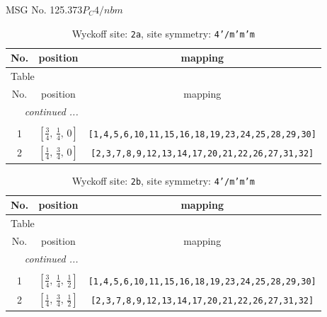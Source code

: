 \documentclass[fleqn,8pt]{jsarticle}
\begin{document}
\setcounter{MaxMatrixCols}{32}

\renewcommand{\tablename}{Table~}
\renewcommand{\figurename}{Figure~}
\begin{center}
\LARGE
MSG No. 125.373\quad$P_{C}4/nbm$
\end{center}
\renewcommand{\arraystretch}{1.2}
\begin{longtable}{ccc}
\caption{Wyckoff site: {\tt 2a}, site symmetry: {\tt 4'/m'm'm}}
 \\
 \hline \hline
No. & position & mapping \\ \hline \endfirsthead

\multicolumn{2}{l}{\tablename\ \thetable{}} \\
 \hline \hline
No. & position & mapping \\ \hline \endhead

 \hline \hline
\multicolumn{2}{r}{\footnotesize\it continued ...} \\ \endfoot

 \hline \hline
\multicolumn{2}{r}{} \\ \endlastfoot

1 & $\left[ \frac{3}{4},\, \frac{1}{4},\, 0 \right]$ & {\tt [1,4,5,6,10,11,15,16,18,19,23,24,25,28,29,30]} \\ \hline
2 & $\left[ \frac{1}{4},\, \frac{3}{4},\, 0 \right]$ & {\tt [2,3,7,8,9,12,13,14,17,20,21,22,26,27,31,32]} \\
\end{longtable}
\renewcommand{\arraystretch}{1.2}
\begin{longtable}{ccc}
\caption{Wyckoff site: {\tt 2b}, site symmetry: {\tt 4'/m'm'm}}
 \\
 \hline \hline
No. & position & mapping \\ \hline \endfirsthead

\multicolumn{2}{l}{\tablename\ \thetable{}} \\
 \hline \hline
No. & position & mapping \\ \hline \endhead

 \hline \hline
\multicolumn{2}{r}{\footnotesize\it continued ...} \\ \endfoot

 \hline \hline
\multicolumn{2}{r}{} \\ \endlastfoot

1 & $\left[ \frac{3}{4},\, \frac{1}{4},\, \frac{1}{2} \right]$ & {\tt [1,4,5,6,10,11,15,16,18,19,23,24,25,28,29,30]} \\ \hline
2 & $\left[ \frac{1}{4},\, \frac{3}{4},\, \frac{1}{2} \right]$ & {\tt [2,3,7,8,9,12,13,14,17,20,21,22,26,27,31,32]} \\
\end{longtable}
\end{document}
